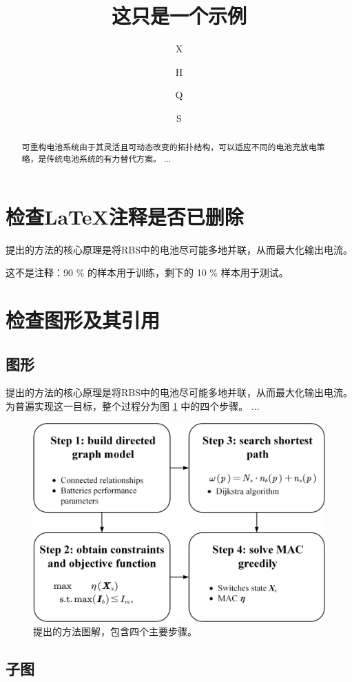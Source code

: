 \documentclass[a4paper,UTF8]{ctexart}
\title{这只是一个示例}
\author[1$\dag$]{X}
\author[1$\dag$]{H}
\author[1*]{Q}
\author[1,2]{S}
\affil[1]{中国R学院}
\affil[2]{中国A学院}
\affil[*]{通讯作者：email}
\affil[$\dag$]{这些作者对本文贡献相同。}
\begin{document}
\maketitle

\begin{abstract}
可重构电池系统由于其灵活且可动态改变的拓扑结构，可以适应不同的电池充放电策略，是传统电池系统的有力替代方案。
...
\end{abstract}

\section{检查LaTeX注释是否已删除}

提出的方法的核心原理是将RBS中的电池尽可能多地并联，从而最大化输出电流。%

这不是注释：90 \% 的样本用于训练，剩下的 10 \% 样本用于测试。

\section{检查图形及其引用}

\subsection{图形}

提出的方法的核心原理是将RBS中的电池尽可能多地并联，从而最大化输出电流。为普遍实现这一目标，整个过程分为图 \ref{fig:main} 中的四个步骤。
...

\begin{figure}[htbp]
    \centering
    \includegraphics[width=0.8\linewidth]{main.png}
    \caption{
        提出的方法图解，包含四个主要步骤。
    }
    \label{fig:main}
\end{figure}

\subsection{子图}
\end{document}
